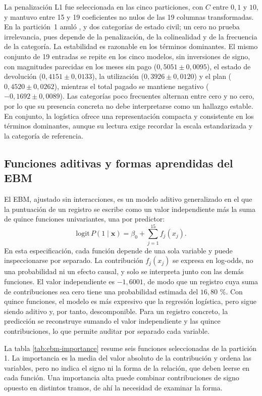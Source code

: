 La penalización L1 fue seleccionada en las cinco particiones, con $C$ entre $0{,}1$ y $10$, y mantuvo entre 15 y 19 coeficientes no nulos de las 19 columnas transformadas. En la partición~1 anuló ,  y dos categorías de estado civil; un cero no prueba irrelevancia, pues depende de la penalización, de la colinealidad y de la frecuencia de la categoría. La estabilidad es razonable en los términos dominantes. El mismo conjunto de 19 entradas se repite en los cinco modelos, sin inversiones de signo, con magnitudes parecidas en los meses sin pago ($0{,}5051 \pm 0{,}0095$), el estado de devolución ($0{,}4151 \pm 0{,}0133$), la utilización ($0{,}3926 \pm 0{,}0120$) y el plan ($0{,}4520 \pm 0{,}0262$), mientras el total pagado se mantiene negativo ($-0{,}1692 \pm 0{,}0089$). Las categorías poco frecuentes alternan entre cero y no cero, por lo que su presencia concreta no debe interpretarse como un hallazgo estable. En conjunto, la logística ofrece una representación compacta y consistente en los términos dominantes, aunque su lectura exige recordar la escala estandarizada y la categoría de referencia.

\subsection{Funciones aditivas y formas aprendidas del EBM}

El EBM, ajustado sin interacciones, es un modelo aditivo generalizado en el que la puntuación de un registro se escribe como un valor independiente más la suma de quince funciones univariantes, una por predictor:
\[
\mathrm{logit}\, P(1 \mid \mathbf{x}) = \beta_0 + \sum_{j=1}^{15} f_j(x_j).
\]
En esta especificación, cada función depende de una sola variable y puede inspeccionarse por separado. La contribución $f_j(x_j)$ se expresa en log-odds, no una probabilidad ni un efecto causal, y solo se interpreta junto con las demás funciones. El valor independiente es $-1{,}6001$, de modo que un registro cuya suma de contribuciones sea cero tiene una probabilidad estimada del $16{,}80$ \%. Con quince funciones, el modelo es más expresivo que la regresión logística, pero sigue siendo aditivo y, por tanto, descomponible. Para un registro concreto, la predicción se reconstruye sumando el valor independiente y las quince contribuciones, lo que permite auditar por separado cada variable.

La tabla \ref{tab:ebm-importance} resume seis funciones seleccionadas de la partición 1. La importancia es la media del valor absoluto de la contribución y ordena las variables, pero no indica el signo ni la forma de la relación, que deben leerse en cada función. Una importancia alta puede combinar contribuciones de signo opuesto en distintos tramos, de ahí la necesidad de examinar la forma.

